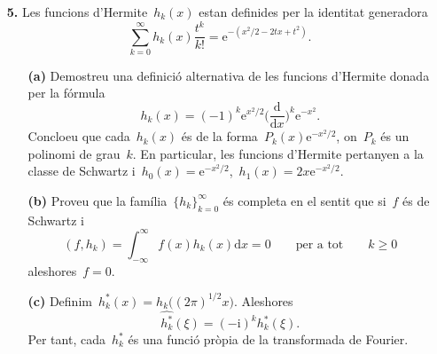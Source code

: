 \documentclass[a4paper]{article}
\theoremstyle{plain}
\theoremstyle{definition}
\newcommand{\iu}{\mathrm{i}}
\newcommand{\e}{\mathrm{e}}
\providecommand{\uppi}{\pi}
\newcommand{\diff}{\mathrm{d}}
\begin{document}
\begin{enumerate}
    \item[\textbf{5.}] Les funcions d'Hermite~\(h_{k}(x)\) estan definides per
        la identitat generadora
        \[
            \sum_{k=0}^{\infty}
            h_{k}(x) \frac{t^{k}}{k!}
            =
            \e^{-(x^{2}/2 - 2tx+t^{2})}.
        \]
        \begin{enumerate}
            \item[\textbf{(a)}] Demostreu una definició alternativa de les
                funcions d'Hermite donada per la fórmula
                \[
                    h_{k}(x)
                    =
                    (-1)^{k} \e^{x^{2}/2}
                    \biggl(\frac{\diff}{\diff x}\biggr)^{k}
                    \e^{-x^{2}}.
                \]
                Concloeu que cada~\(h_{k}(x)\) és de la
                forma~\(P_{k}(x)\e^{-x^{2}/2}\), on~\(P_{k}\) és un polinomi de
                grau~\(k\).
                En particular, les funcions d'Hermite pertanyen a la classe de
                Schwartz i~\(h_{0}(x) =
                \e^{-x^{2}/2}\),~\(h_{1}(x)=2x\e^{-x^{2}/2}\).
        \end{enumerate}
\end{enumerate}

\begin{enumerate}
    \item[]\begin{enumerate}
        \item[\textbf{(b)}] Proveu que la família~\(\{h_{k}\}_{k=0}^{\infty}\)
            és completa en el sentit que si~\(f\) és de Schwartz i
            \[
                (f,h_{k}) = \int_{-\infty}^{\infty}f(x)h_{k}(x)\diff x = 0
                \qquad\text{per a tot}\qquad
                k\geq0
            \]
            aleshores~\(f=0\).
    \end{enumerate}
\end{enumerate}

\begin{enumerate}
    \item[]\begin{enumerate}
        \item[\textbf{(c)}]
            Definim~\(h^{\ast}_{k}(x)=h_{k}\bigl((2\uppi)^{1/2}x\bigr)\).
            Aleshores
            \[
                \widehat{h^{\ast}_{k}}(\xi) = (-\iu)^{k}h_{k}^{\ast}(\xi).
            \]
            Per tant, cada~\(h^{\ast}_{k}\) és una funció pròpia de la
            transformada de Fourier.
    \end{enumerate}
\end{enumerate}
\end{document}
